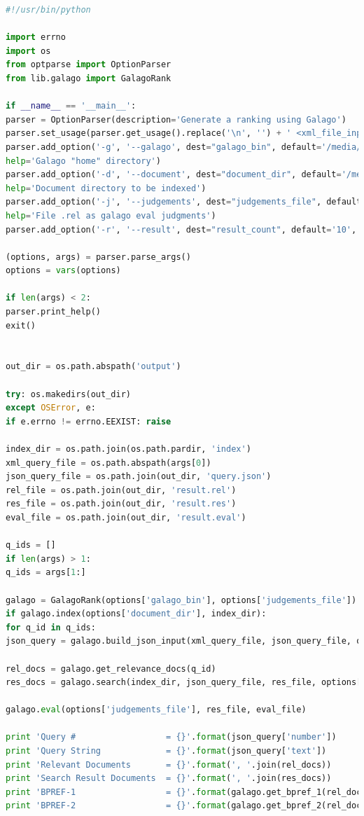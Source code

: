 \documentclass[letterpaper,11pt]{article}
\begin{document}
\begin{lstlisting}[language=python, caption={Code for calculating BPREF values}, label={lst:89}]
#!/usr/bin/python

import errno
import os
from optparse import OptionParser
from lib.galago import GalagoRank

if __name__ == '__main__':
parser = OptionParser(description='Generate a ranking using Galago')
parser.set_usage(parser.get_usage().replace('\n', '') + ' <xml_file_input> [q1 ... qn]')
parser.add_option('-g', '--galago', dest="galago_bin", default='/media/erikaris/DATA/ODU/Semester_3/intro_to_info_retrieval/galago/galago-3.10-bin/bin/galago',
help='Galago "home" directory')
parser.add_option('-d', '--document', dest="document_dir", default='/media/erikaris/DATA/ODU/Semester_3/intro_to_info_retrieval/assignments/a4/code-report/cacm',
help='Document directory to be indexed')
parser.add_option('-j', '--judgements', dest="judgements_file", default='/media/erikaris/DATA/ODU/Semester_3/intro_to_info_retrieval/assignments/a4/code-report/cacm.rel',
help='File .rel as galago eval judgments')
parser.add_option('-r', '--result', dest="result_count", default='10', help='Number of result')

(options, args) = parser.parse_args()
options = vars(options)

if len(args) < 2:
parser.print_help()
exit()


out_dir = os.path.abspath('output')

try: os.makedirs(out_dir)
except OSError, e:
if e.errno != errno.EEXIST: raise

index_dir = os.path.join(os.path.pardir, 'index')
xml_query_file = os.path.abspath(args[0])
json_query_file = os.path.join(out_dir, 'query.json')
rel_file = os.path.join(out_dir, 'result.rel')
res_file = os.path.join(out_dir, 'result.res')
eval_file = os.path.join(out_dir, 'result.eval')

q_ids = []
if len(args) > 1:
q_ids = args[1:]

galago = GalagoRank(options['galago_bin'], options['judgements_file'])
if galago.index(options['document_dir'], index_dir):
for q_id in q_ids:
json_query = galago.build_json_input(xml_query_file, json_query_file, q_id)

rel_docs = galago.get_relevance_docs(q_id)
res_docs = galago.search(index_dir, json_query_file, res_file, options['result_count'])

galago.eval(options['judgements_file'], res_file, eval_file)

print 'Query #                  = {}'.format(json_query['number'])
print 'Query String             = {}'.format(json_query['text'])
print 'Relevant Documents       = {}'.format(', '.join(rel_docs))
print 'Search Result Documents  = {}'.format(', '.join(res_docs))
print 'BPREF-1                  = {}'.format(galago.get_bpref_1(rel_docs, res_docs))
print 'BPREF-2                  = {}'.format(galago.get_bpref_2(rel_docs, res_docs))


\end{lstlisting}

\medskip


\end{document}
